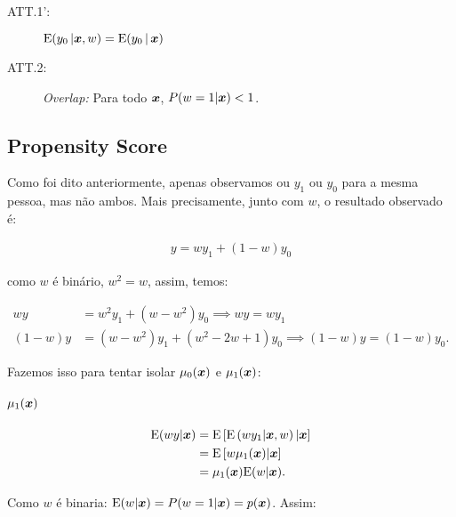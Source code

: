 \documentclass[11pt, oneside, a4paper, article]{article}
\numberwithin{equation}{section}
\begin{document}
\begin{description}
\begin{description}
	\item[ATT.1':] 
		$\text{E}( y_{0} \, | \boldsymbol{x}, w ) = \text{E}( y_{0} \, | \, \boldsymbol{x} )$

	\item[ATT.2:] \textit{Overlap:} Para todo $\boldsymbol{x}$, $P(w=1 | \boldsymbol{x} ) < 1$.
\end{description}

\subsection{Propensity Score}

Como foi dito anteriormente, apenas observamos ou $y_{1}$ ou $y_{0}$ para a mesma pessoa, mas não ambos.
Mais precisamente, junto com $w$, o resultado observado é:

\vspace{-1 em}
\begin{align*}
	y = wy_{1} + (1 - w) y_{0}
\end{align*}

\noindent
como  $w$ é binário, $w^2 = w$, assim, temos:

\vspace{-1 em}
\begin{align*}
	w y &= w^{2} y_{1} + (w - w^{2}) y_{0}
	\implies
	\boxed{w y = w y_{1} }
	\\
	( 1 - w ) y &= (w - w^{2}) y_{1} + ( w^{2} - 2w + 1 ) y_{0}
	\implies
	\boxed{( 1 - w ) y = (1 - w) y_{0}}.
\end{align*}

Fazemos isso para tentar isolar $\mu_{0}(\boldsymbol{x})$ e $\mu_{1}(\boldsymbol{x})$:

\paragraph{$\mu_{1}( \boldsymbol{x} )$}

\begin{align*}
	\text{E}( w y | \boldsymbol{x} ) &= \text{E}\left[  \text{E} \left( w y_{1} | \boldsymbol{x}, w  \right) | \boldsymbol{x} \right]
	\\ &=
	\text{E} \left[ w \mu_{1}(\boldsymbol{x}) | \boldsymbol{x} \right]
	\\ &=
	\mu_{1}(\boldsymbol{x}) \text{E}(w | \boldsymbol{x} ).
\end{align*}

\noindent
Como $w$ é binaria: $\text{E}(w| \boldsymbol{x}) = P(w=1 | \boldsymbol{x}) = p(\boldsymbol{x})$.
Assim:


\end{description}
\end{document}
